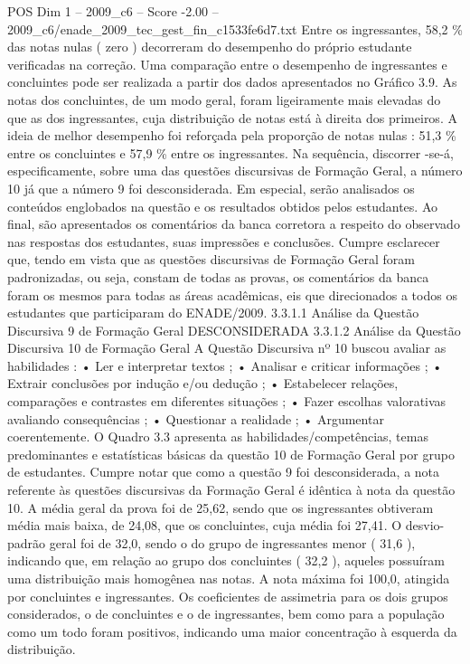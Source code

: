 \begin{textsample}{POS Dim 1 – 2009\_c6 – Score -2.00 – 2009\_c6/enade\_2009\_tec\_gest\_fin\_c1533fe6d7.txt}
Entre os ingressantes, 58,2 \% das notas nulas ( zero ) decorreram do desempenho do próprio estudante verificadas na correção.
Uma comparação entre o desempenho de ingressantes e concluintes pode ser realizada a partir dos dados apresentados no Gráfico 3.9.
As notas dos concluintes, de um modo geral, foram ligeiramente mais elevadas do que as dos ingressantes, cuja distribuição de notas está à direita dos primeiros.
A ideia de melhor desempenho foi reforçada pela proporção de notas nulas : 51,3 \% entre os concluintes e 57,9 \% entre os ingressantes.
Na sequência, discorrer -se-á, especificamente, sobre uma das questões discursivas de Formação Geral, a número 10 já que a número 9 foi desconsiderada.
Em especial, serão analisados os conteúdos englobados na questão e os resultados obtidos pelos estudantes.
Ao final, são apresentados os comentários da banca corretora a respeito do observado nas respostas dos estudantes, suas impressões e conclusões.
Cumpre esclarecer que, tendo em vista que as questões discursivas de Formação Geral foram padronizadas, ou seja, constam de todas as provas, os comentários da banca foram os mesmos para todas as áreas acadêmicas, eis que direcionados a todos os estudantes que participaram do ENADE/2009. 3.3.1.1 Análise da Questão Discursiva 9 de Formação Geral DESCONSIDERADA 3.3.1.2 Análise da Questão Discursiva 10 de Formação Geral A Questão Discursiva nº 10 buscou avaliar as habilidades : • Ler e interpretar textos ; • Analisar e criticar informações ; • Extrair conclusões por indução e/ou dedução ; • Estabelecer relações, comparações e contrastes em diferentes situações ; • Fazer escolhas valorativas avaliando consequências ; • Questionar a realidade ; • Argumentar coerentemente.
O Quadro 3.3 apresenta as habilidades/competências, temas predominantes e estatísticas básicas da questão 10 de Formação Geral por grupo de estudantes.
Cumpre notar que como a questão 9 foi desconsiderada, a nota referente às questões discursivas da Formação Geral é idêntica à nota da questão 10.
A média geral da prova foi de 25,62, sendo que os ingressantes obtiveram média mais baixa, de 24,08, que os concluintes, cuja média foi 27,41.
O desvio-padrão geral foi de 32,0, sendo o do grupo de ingressantes menor ( 31,6 ), indicando que, em relação ao grupo dos concluintes ( 32,2 ), aqueles possuíram uma distribuição mais homogênea nas notas.
A nota máxima foi 100,0, atingida por concluintes e ingressantes.
Os coeficientes de assimetria para os dois grupos considerados, o de concluintes e o de ingressantes, bem como para a população como um todo foram positivos, indicando uma maior concentração à esquerda da distribuição.

\end{textsample}
